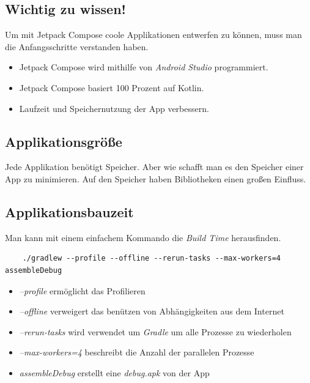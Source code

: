 \subsection{Wichtig zu wissen!}
\author{Bozidar Spasenovic}
\cite{Jetpack-Compose-Docu}
Um mit Jetpack Compose coole Applikationen entwerfen zu können, muss man die Anfangsschritte verstanden haben.

\begin{itemize}
    \item Jetpack Compose wird mithilfe von \textit{Android Studio} programmiert.
    \item Jetpack Compose basiert 100 Prozent auf Kotlin. 
    \item Laufzeit und Speichernutzung der App verbessern.
\end{itemize}

\subsection{Applikationsgröße}
\author{Bozidar Spasenovic}
Jede Applikation benötigt Speicher. Aber wie schafft man es den Speicher einer App zu minimieren. 
Auf den Speicher haben Bibliotheken einen großen Einfluss. 

\subsection{Applikationsbauzeit}
\author{Bozidar Spasenovic}
\cite{Jetpack-Compose-Build}
Man kann mit einem einfachem Kommando die \textit{Build Time} herausfinden.
\begin{lstlisting}
    ./gradlew --profile --offline --rerun-tasks --max-workers=4 assembleDebug
\end{lstlisting}

\begin{itemize}
    \item \textit{--profile} ermöglicht das Profilieren
    \item \textit{--offline} verweigert das benützen von Abhängigkeiten aus dem Internet
    \item \textit{--rerun-tasks} wird verwendet um \textit{Gradle} um alle Prozesse zu wiederholen
    \item \textit{--max-workers=4} beschreibt die Anzahl der parallelen Prozesse \cite{Gradle-Max-Worker}
    \item \textit{assembleDebug} erstellt eine \textit{debug.apk} von der App
\end{itemize}



